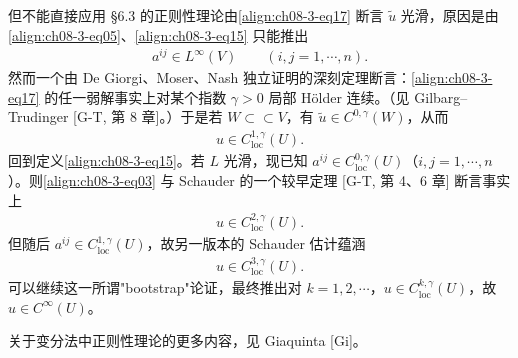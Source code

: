\documentclass[../../main.tex]{subfiles}
\begin{document}
但不能直接应用 \S6.3 的正则性理论由\eqref{align:ch08-3-eq17} 断言 $\widetilde{u}$ 光滑，原因是由\eqref{align:ch08-3-eq05}、\eqref{align:ch08-3-eq15} 只能推出
\begin{align*}
a^{ij}\in L^\infty(V)\qquad (i,j=1,\cdots,n).
\end{align*}
然而一个由 De Giorgi、Moser、Nash 独立证明的深刻定理断言：\eqref{align:ch08-3-eq17} 的任一弱解事实上对某个指数 $\gamma>0$ 局部 Hölder 连续。（见 Gilbarg--Trudinger [G-T, 第 8 章]。）于是若 $W\subset \subset V$，有 $\widetilde{u}\in C^{0,\gamma}(W)$，从而
\begin{align*}
u\in C^{1,\gamma}_{\mathrm{loc}}(U).
\end{align*}
回到定义\eqref{align:ch08-3-eq15}。若 $L$ 光滑，现已知 $a^{ij}\in C^{0,\gamma}_{\mathrm{loc}}(U)$（$i,j=1,\cdots,n$）。则\eqref{align:ch08-3-eq03} 与 Schauder 的一个较早定理 [G-T, 第 4、6 章] 断言事实上
\begin{align*}
u\in C^{2,\gamma}_{\mathrm{loc}}(U).
\end{align*}
但随后 $a^{ij}\in C^{1,\gamma}_{\mathrm{loc}}(U)$，故另一版本的 Schauder 估计蕴涵
\begin{align*}
u\in C^{3,\gamma}_{\mathrm{loc}}(U).
\end{align*}
可以继续这一所谓"bootstrap"论证，最终推出对 $k=1,2,\cdots$，$u\in C^{k,\gamma}_{\mathrm{loc}}(U)$，故 $u\in C^\infty(U)$。

关于变分法中正则性理论的更多内容，见 Giaquinta [Gi]。
\end{document}
